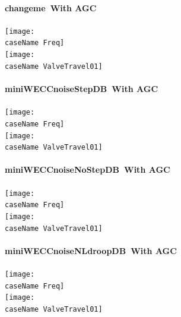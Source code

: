 \documentclass[12pt]{article}
\newcommand{\caseName}{changeme}
\begin{document}
\paragraph{\caseName\ With AGC} 
\begin{center}
	\texttt{[image: \\caseName Freq]}\\
	\texttt{[image: \\caseName ValveTravel01]} \\
\end{center}

\renewcommand{\caseName}{miniWECCnoiseStepDB}
\paragraph{\caseName\ With AGC} 
\begin{center}
	\texttt{[image: \\caseName Freq]}\\
	\texttt{[image: \\caseName ValveTravel01]} \\
\end{center}
\pagebreak

\renewcommand{\caseName}{miniWECCnoiseNoStepDB}
\paragraph{\caseName\ With AGC} 
\begin{center}
	\texttt{[image: \\caseName Freq]}\\
	\texttt{[image: \\caseName ValveTravel01]} \\
\end{center}
\renewcommand{\caseName}{miniWECCnoiseNLdroopDB}
\paragraph{\caseName\ With AGC} 
\begin{center}
	\texttt{[image: \\caseName Freq]}\\
	\texttt{[image: \\caseName ValveTravel01]} \\
\end{center}



\end{document}
